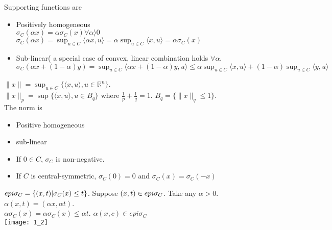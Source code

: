 \documentclass[11pt,fleqn]{book} %
\def\R{\mathbb{R}}
\begin{document}
\begin{CJK}{UTF8}{gkai}
Supporting functions are
\begin{itemize}
\item Positively homogeneous\\
$\sigma_C(\alpha x) = \alpha \sigma_C(x) \forall \alpha \rangle  0$ \\
$\sigma_C(\alpha x ) = \sup_{u \in C} \langle \alpha x, u\rangle  = \alpha \sup_{u \in C} \langle x, u\rangle  = \alpha \sigma_C(x)$
\item Sub-linear( a special case of convex, linear combination holds $\forall \alpha$.\\
$\sigma_C(\alpha x + (1 - \alpha) y ) = \sup_{u \in C} \langle \alpha x + (1 - \alpha) y,u\rangle  \le \alpha\sup_{u \in C}\langle x,u\rangle  + (1 - \alpha)\sup_{u \in C}\langle y,u\rangle  $
\end{itemize}
\begin{example}[L2-norm]
$\| x \| = \sup_{u \in C} \{ \langle x, u \rangle, u \in \R^n \}$.\\
$\|x \|_p = \sup \{ \langle x, u \rangle, u \in B_q \}$ where $\frac{1}{p} + \frac{1}{q} = 1$. $B_q = \{ \|x \|_q \le 1\}$.\\
The norm is 
\begin{itemize}
\item Positive homogeneous
\item sub-linear
\item If $0 \in C$, $\sigma_C$ is non-negative.
\item If $C$ is central-symmetric, $\sigma_C(0) = 0$ and $\sigma_C(x) = \sigma_C(-x)$
\end{itemize}
\end{example}

\begin{fact}
$epi \space \sigma_C = \{ (x,t) | \sigma_C(x) \le t\}$.
Suppose $(x,t) \in epi \space \sigma_C$. Take any  $\alpha > 0$. $\alpha(x,t) = (\alpha x, \alpha t)$.\\
$\alpha \sigma_C(x) = \alpha \sigma_C(x) \le \alpha t$. $\alpha(x,c) \in epi 
\sigma_C$\\
\texttt{[image: 1\_2]}
\end{fact}


\end{CJK}
\end{document}

